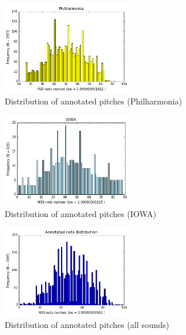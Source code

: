 \documentclass{proc}
\begin{document}
\begin{figure}
    \centering
    \includegraphics[width=0.5\textwidth]{img/distr_ph.png}
    \caption{Distribution of annotated pitches (Philharmonia)}
    \label{fig:ph_d}
\end{figure}
\begin{figure}
    \centering
    \includegraphics[width=0.5\textwidth]{img/distr_iw.png}
    \caption{Distribution of annotated pitches (IOWA)}
    \label{fig:iw_d}
\end{figure}
\begin{figure}
    \centering
    \includegraphics[width=0.5\textwidth]{img/distr_tot.png}
    \caption{Distribution of annotated pitches (all sounds)}
    \label{fig:tot_d}
\end{figure}
\end{document}
